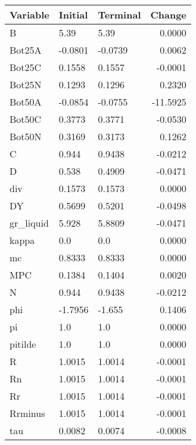\begin{table}
\centering
\label{tab:stst_comparison_end_L_limit_permanent}
\begin{tabular}{lllr}
\toprule
                Variable & Initial & Terminal &   Change \\
\midrule
                       B &    5.39 &     5.39 &   0.0000 \\
                  Bot25A & -0.0801 &  -0.0739 &   0.0062 \\
                  Bot25C &  0.1558 &   0.1557 &  -0.0001 \\
                  Bot25N &  0.1293 &   0.1296 &   0.2320 \\
                  Bot50A & -0.0854 &  -0.0755 & -11.5925 \\
                  Bot50C &  0.3773 &   0.3771 &  -0.0530 \\
                  Bot50N &  0.3169 &   0.3173 &   0.1262 \\
                       C &   0.944 &   0.9438 &  -0.0212 \\
                       D &   0.538 &   0.4909 &  -0.0471 \\
                     div &  0.1573 &   0.1573 &   0.0000 \\
                      DY &  0.5699 &   0.5201 &  -0.0498 \\
               gr\_liquid &   5.928 &   5.8809 &  -0.0471 \\
                   kappa &     0.0 &      0.0 &   0.0000 \\
                      mc &  0.8333 &   0.8333 &   0.0000 \\
                     MPC &  0.1384 &   0.1404 &   0.0020 \\
                       N &   0.944 &   0.9438 &  -0.0212 \\
                     phi & -1.7956 &   -1.655 &   0.1406 \\
                      pi &     1.0 &      1.0 &   0.0000 \\
                 pitilde &     1.0 &      1.0 &   0.0000 \\
                       R &  1.0015 &   1.0014 &  -0.0001 \\
                      Rn &  1.0015 &   1.0014 &  -0.0001 \\
                      Rr &  1.0015 &   1.0014 &  -0.0001 \\
                 Rrminus &  1.0015 &   1.0014 &  -0.0001 \\
                     tau &  0.0082 &   0.0074 &  -0.0008 \\

\end{tabular}
\end{table}
